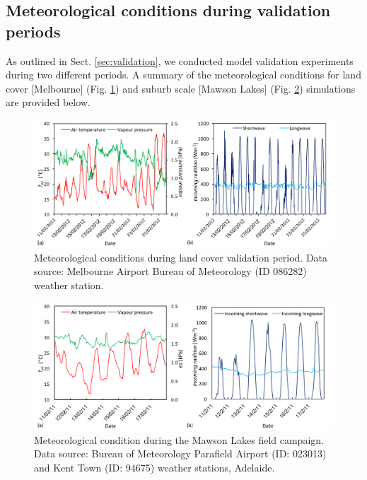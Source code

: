 \documentclass[gmd, manuscript]{copernicus}
\begin{document}
\subsection{Meteorological conditions during validation periods}

As outlined in Sect. \ref{sec:validation}, we conducted model validation experiments during two different periods. A summary of the meteorological conditions for land cover [Melbourne] (Fig. \ref{fig:met}) and suburb scale [Mawson Lakes] (Fig. \ref{fig:met3}) simulations are provided below.

\begin{figure}[!htbp]

\includegraphics[width=1\textwidth,keepaspectratio]{figure11.png}

 \caption{Meteorological conditions during land cover validation period. Data source: Melbourne Airport Bureau of Meteorology (ID 086282) weather station.} \label{fig:met}
\end{figure}

\begin{figure}[!htbp]

\includegraphics[width=1\textwidth,keepaspectratio]{figure12.png}

 \caption{Meteorological condition during the Mawson Lakes field campaign. Data source: Bureau of Meteorology Parafield Airport (ID: 023013) and Kent Town (ID: 94675) weather stations, Adelaide.} \label{fig:met3}
\end{figure}
\end{document}
